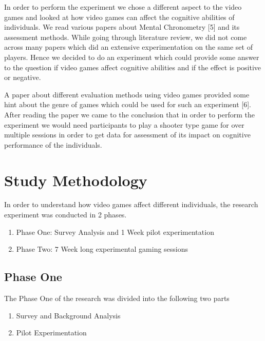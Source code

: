 \documentclass[conference]{IEEEtran}
\begin{document}
\newline
\newline
\begin{flushleft}
    
In order to perform the experiment we chose a different aspect to the video games and looked at how video games can affect the cognitive abilities of individuals. We read various papers about Mental Chronometry [5] and its assessment methods. While going through literature review, we did not come across many papers which did an extensive experimentation on the same set of players. Hence we decided to do an experiment which could provide some answer to the question if video games affect cognitive abilities and if the effect is positive or negative.
\end{flushleft}
\newline
\newline
A paper about different evaluation methods using video games provided some hint about the genre of games which could be used for such an experiment [6]. After reading the paper we came to the conclusion that in order to perform the experiment we would need participants to play a shooter type game for over multiple sessions in order to get data for assessment of its impact on cognitive performance of the individuals.



\section{Study Methodology}
In order to understand how video games affect different individuals, the research experiment was conducted in 2 phases. 
\begin{enumerate}
    \item Phase One: Survey Analysis and 1 Week pilot experimentation
    \item Phase Two: 7 Week long experimental gaming sessions
\end{enumerate}
\subsection{Phase One}
The Phase One of the research was divided into the following two parts
\begin{enumerate}
    \item Survey and Background Analysis
    \item Pilot Experimentation
\end{enumerate}
\end{document}
